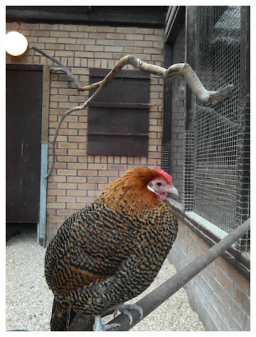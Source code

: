 \documentclass{l4proj}
\begin{document}
\begin{figure}[ht]
\begin{subfigure}[h!]{0.18\textwidth}
    \includegraphics[width=\textwidth, trim={0cm 2.5cm 0cm 2.5cm}, clip]{images/dataset/pretty_chicken/rgb.png}

\end{subfigure}
\end{figure}
\end{document}
